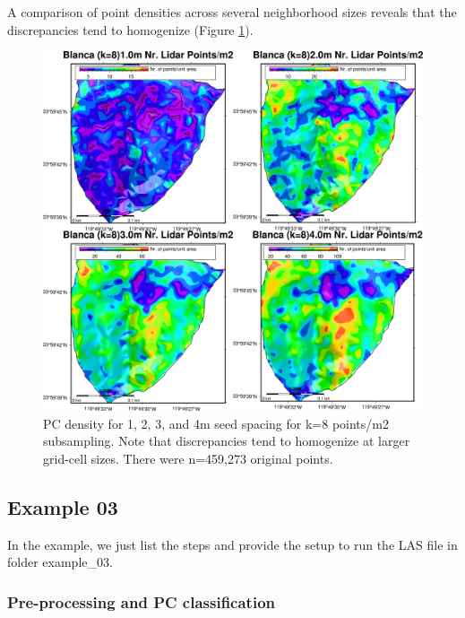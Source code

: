 \documentclass[a4paperpaper,,tablecaptionabove]{scrartcl}
\begin{document}
A comparison of point densities across several neighborhood sizes
reveals that the discrepancies tend to homogenize (Figure
\ref{Fig:k8_DEM_PC_density_1m_2m_3m_4m}).

\begin{figure}
\centering
\includegraphics{./tex2pdf.-e6884bf2dada0f3b/500d8ab9855c1f770ec1a443106731b29cb99554.png}
\caption{PC density for 1, 2, 3, and 4m seed spacing for k=8 points/m2
subsampling. Note that discrepancies tend to homogenize at larger
grid-cell sizes. There were n=459,273 original
points.\label{Fig:k8_DEM_PC_density_1m_2m_3m_4m}}
\end{figure}

\hypertarget{example-03}{%
\subsection{Example 03}\label{example-03}}

In the example, we just list the steps and provide the setup to run the
LAS file in folder example\_03.

\hypertarget{pre-processing-and-pc-classification}{%
\subsubsection{Pre-processing and PC
classification}\label{pre-processing-and-pc-classification}}
\end{document}
